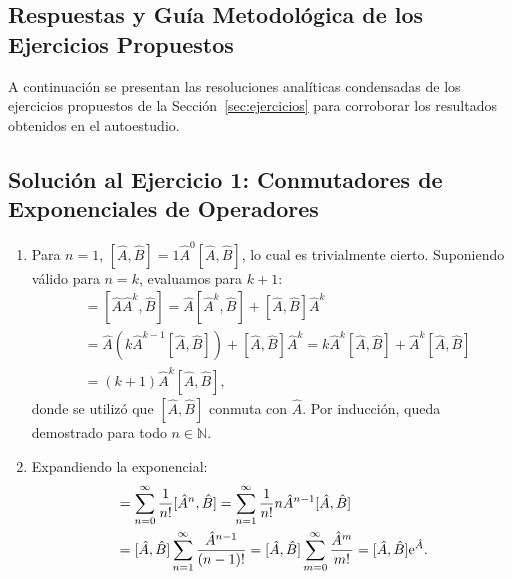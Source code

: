 \begin{appendices}
\section{Respuestas y Guía Metodológica de los Ejercicios Propuestos}
\label{anexo:solucionario}

A continuación se presentan las resoluciones analíticas condensadas de los ejercicios propuestos de la Sección~\ref{sec:ejercicios} para corroborar los resultados obtenidos en el autoestudio.

\subsection[Solución 1: Conmutadores de exponenciales]{Solución al Ejercicio 1: Conmutadores de Exponenciales de Operadores}
\begin{enumerate}
    \item Para $n = 1$, $[\hat{A}, \hat{B}] = 1\hat{A}^0[\hat{A}, \hat{B}]$, lo cual es trivialmente cierto. Suponiendo válido para $n = k$, evaluamos para $k+1$:
    \begin{align}
        [\hat{A}^{k+1}, \hat{B}] &= [\hat{A}\hat{A}^k, \hat{B}] = \hat{A}[\hat{A}^k, \hat{B}] + [\hat{A}, \hat{B}]\hat{A}^k \nonumber\\
        &= \hat{A}(k\hat{A}^{k-1}[\hat{A}, \hat{B}]) + [\hat{A}, \hat{B}]\hat{A}^k = k\hat{A}^k[\hat{A}, \hat{B}] + \hat{A}^k[\hat{A}, \hat{B}] \nonumber\\
        &= (k+1)\hat{A}^k[\hat{A}, \hat{B}],
    \end{align}
    donde se utilizó que $[\hat{A}, \hat{B}]$ conmuta con $\hat{A}$. Por inducción, queda demostrado para todo $n \in \mathbb{N}$.
    \item Expandiendo la exponencial:
    \begin{align}
        [\eu^{\hat{A}}, \hat{B}] &= \sum_{n=0}^\infty \frac{1}{n!}[\hat{A}^n, \hat{B}] = \sum_{n=1}^\infty \frac{1}{n!} n\hat{A}^{n-1}[\hat{A}, \hat{B}] \nonumber\\
        &= [\hat{A}, \hat{B}]\sum_{n=1}^\infty \frac{\hat{A}^{n-1}}{(n-1)!} = [\hat{A}, \hat{B}]\sum_{m=0}^\infty \frac{\hat{A}^m}{m!} = [\hat{A}, \hat{B}]\eu^{\hat{A}}.
    \end{align}
\end{enumerate}


\end{appendices}
